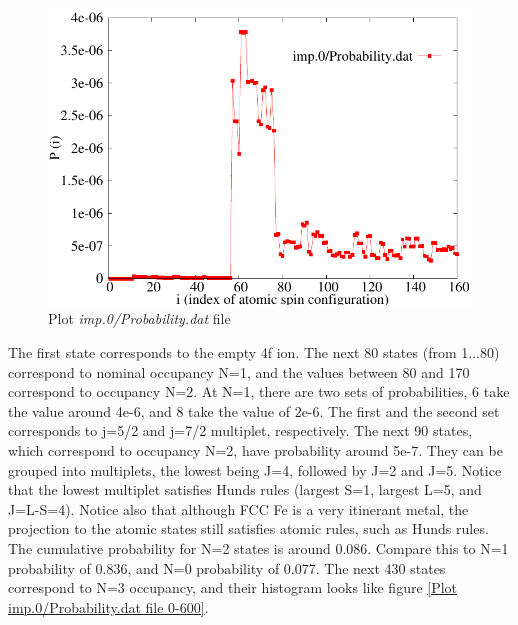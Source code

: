 \documentclass[12 pt]{article}
\begin{document}
\begin{itemize}
  \begin{figure}[ht]
    \centering
    \captionsetup{justification=centering}
    \caption{Plot \emph{imp.0/Probability.dat} file}
    \label{Plot imp.0/Probability.dat file 0-170}
    \vspace{2ex}
    \includegraphics[scale=0.8]{gnuplotProbability}
  \end{figure}

  The first state corresponds to the empty 4f ion. The next 80 states (from 1...80) correspond to nominal occupancy 
N=1, and the values between 80 and 170 correspond to occupancy N=2. At N=1, there are two sets of probabilities, 6 
take the value around 4e-6, and 8 take the value of 2e-6. The first and the second set corresponds to j=5/2 and 
j=7/2 multiplet, respectively. The next 90 states, which correspond to occupancy N=2, have probability around 5e-7. 
They can be grouped into multiplets, the lowest being J=4, followed by J=2 and J=5. Notice that the lowest multiplet 
satisfies Hunds rules (largest S=1, largest L=5, and J=L-S=4). Notice also that although FCC Fe is a very itinerant 
metal, the projection to the atomic states still satisfies atomic rules, such as Hunds rules. The cumulative 
probability for N=2 states is around 0.086. Compare this to N=1 probability of 0.836, and N=0 probability of 0.077. 
The next 430 states correspond to N=3 occupancy, and their histogram looks like figure 
\ref{Plot imp.0/Probability.dat file 0-600}.
  

\end{itemize}
\end{document}
